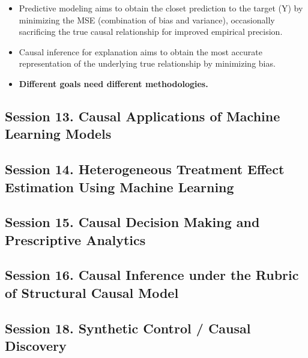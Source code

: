 \documentclass[
]{book}
\providecommand{\tightlist}{%
  \setlength{\itemsep}{0pt}\setlength{\parskip}{0pt}}
\theoremstyle{definition}
\theoremstyle{definition}
\theoremstyle{definition}
\theoremstyle{definition}
\theoremstyle{remark}
\begin{document}
\begin{itemize}
\tightlist
\item
  Predictive modeling aims to obtain the closet prediction to the target (Y) by minimizing the MSE (combination of bias and variance), occasionally sacrificing the true causal relationship for improved empirical precision.
\item
  Causal inference for explanation aims to obtain the most accurate representation of the underlying true relationship by minimizing bias.
\item
  \textbf{Different goals need different methodologies.}
\end{itemize}

\hypertarget{session-13.-causal-applications-of-machine-learning-models}{%
\subsection{Session 13. Causal Applications of Machine Learning Models}\label{session-13.-causal-applications-of-machine-learning-models}}

\hypertarget{session-14.-heterogeneous-treatment-effect-estimation-using-machine-learning}{%
\subsection{Session 14. Heterogeneous Treatment Effect Estimation Using Machine Learning}\label{session-14.-heterogeneous-treatment-effect-estimation-using-machine-learning}}

\hypertarget{session-15.-causal-decision-making-and-prescriptive-analytics}{%
\subsection{Session 15. Causal Decision Making and Prescriptive Analytics}\label{session-15.-causal-decision-making-and-prescriptive-analytics}}

\hypertarget{session-16.-causal-inference-under-the-rubric-of-structural-causal-model}{%
\subsection{Session 16. Causal Inference under the Rubric of Structural Causal Model}\label{session-16.-causal-inference-under-the-rubric-of-structural-causal-model}}

\hypertarget{session-18.-synthetic-control-causal-discovery}{%
\subsection{Session 18. Synthetic Control / Causal Discovery}\label{session-18.-synthetic-control-causal-discovery}}
\end{document}
